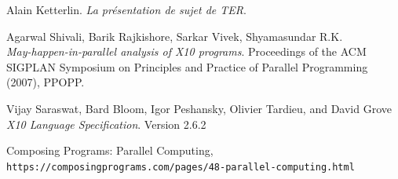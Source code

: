\documentclass[12pt]{scrartcl}
\begin{document}
\newpage      
\begin{thebibliography}{9}
  Alain Ketterlin.
  \textit{La présentation de sujet de TER}. 
   
  Agarwal Shivali, Barik Rajkishore, Sarkar Vivek, Shyamasundar R.K.\\
  \textit{May-happen-in-parallel analysis of X10 programs}.
  Proceedings of the ACM SIGPLAN Symposium on Principles and Practice of Parallel Programming (2007), PPOPP.
   
  Vijay Saraswat, Bard Bloom, Igor Peshansky, Olivier Tardieu, and David Grove
  \textit{X10 Language Specification}. 
  Version 2.6.2

  Composing Programs: Parallel Computing,
  \\\texttt{https://composingprograms.com/pages/48-parallel-computing.html}
  \end{thebibliography}
 
\end{document}
